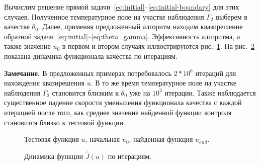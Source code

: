 Вычислим решение прямой задачи~\eqref{eq:initial}--\eqref{eq:initial-boundary} для этих случаев.
Полученное температурное поле на участке наблюдения $\Gamma_2$ выберем в качестве $\theta_0$.
Далее, применяя предложенный алгоритм находим квазирешение
обратной задачи~\eqref{eq:initial}--\eqref{eq:theta_gamma}.
Эффективность алгоритма, а также значение $u_0$ в первом и
втором случаях иллюстрируются рис.~\ref{fig:control}.
На рис.~\ref{fig:cost} показана динамика функционала качества по итерациям.

\textbf{Замечание.} В предложенных примерах потребовалось $2*10^6$ итераций для нахождения квазирешения $u$.
В то же время температурное поле на участке наблюдения $\Gamma_2$ становится близким
к $\theta_0$ уже на $10^2$ итерации.
Также наблюдается существенное падение скорости уменьшения функционала качества с
каждой итерацией после того, как среднее значение найденной функции контроля
становится близко к тестовой функции.
\begin{figure}[H]
    \centering
    \caption{Тестовая функция $u$, начальная $u_0$, найденная функция $u_{end}.$}
    \label{fig:control}
\end{figure}

\begin{figure}[H]
    \centering
    \caption{Динамика функции $\hat{J}(u)$ по итерациям.}
    \label{fig:cost}
\end{figure}

\clearpage
